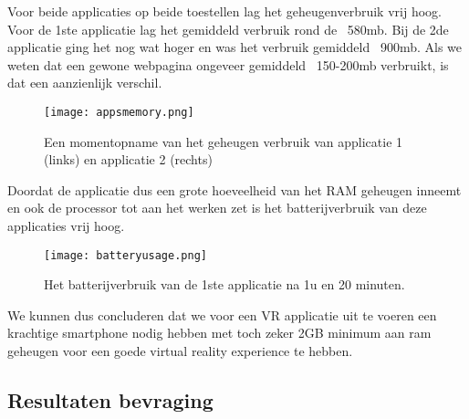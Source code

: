Voor beide applicaties op beide toestellen lag het geheugenverbruik vrij hoog. Voor de 1ste applicatie lag het gemiddeld verbruik rond de ~580mb. Bij de 2de applicatie ging het nog wat hoger en was het verbruik gemiddeld ~900mb.  Als we weten dat een gewone webpagina ongeveer gemiddeld ~150-200mb verbruikt, is dat een aanzienlijk verschil.

\begin{figure}[H]
	\centering
	\texttt{[image: appsmemory.png]}
	\caption{Een momentopname van het geheugen verbruik van applicatie 1 (links) en applicatie 2 (rechts)}
	\label{fig:appsmemory}
\end{figure}

Doordat de applicatie dus een grote hoeveelheid van het RAM geheugen inneemt en ook de processor tot aan het werken zet is het batterijverbruik van deze applicaties vrij hoog.

\begin{figure}
	\centering
	\texttt{[image: batteryusage.png]}
	\caption{Het batterijverbruik van de 1ste applicatie na 1u en 20 minuten.}
	\label{fig:batteryusage}
\end{figure}

We kunnen dus concluderen dat we voor een VR applicatie uit te voeren een krachtige smartphone nodig hebben met toch zeker 2GB minimum aan ram geheugen voor een goede virtual reality experience te hebben.

\subsection{Resultaten bevraging}
\label{sec:resulaten-apps}

